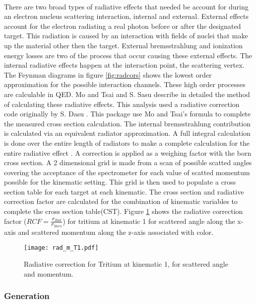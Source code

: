 \paragraph{}There are two broad types of radiative effects that needed be account for during an electron nucleus scattering interaction, internal and external. External effects account for the electron radiating a real photon before or after the designated target. This radiation is caused by an interaction with fields of nuclei that make up the material other then the target. External bremsstrahlung and ionization energy losses are two of the process that occur causing these external effects. The internal radiative effects happen at the interaction point, the scattering vertex. The Feynman diagrams in figure \ref{fig:radcors} shows the lowest order approximation for the possible interaction channels. These high order processes are calculable in QED. Mo and Tsai \cite{radcors2} and S. Sasu \cite{radcors} describe in detailed the method of calculating these radiative effects. This analysis used a radiative correction code originally by S. Dasu \cite{radcors}. This package use Mo and Tsai's formula to complete the measured cross section calculation.  The internal bremsstrahlung contribution is calculated via an equivalent radiator approximation. A full integral calculation is done over the entire length of radiators to make a complete calculation for the entire radiative effect  \cite{Ajth,radcors,radcors2,seelyth}. A correction is applied as a weighing factor with the born cross section. A 2 dimensional grid is made from a scan of possible scatted angles covering the acceptance of the spectrometer for each value of scatted momentum possible for the kinematic setting. This grid is then used to populate a cross section table for each target at each kinematic. The cross section and radiative correction factor are calculated for the combination of kinematic variables to complete the cross section table(CST). Figure \ref{RCF} shows the radiative correction factor ($RCF=\frac{\sigma_{Rad}}{\sigma_{Born}}$) for tritium at kinematic 1 for scattered angle along the x-axis and scattered momentum along the z-axis associated with color.  
\begin{figure}
	\caption{Radiative correction for Tritium at kinematic 1, for scattered angle and momentum.\label{RCF}}
	\hspace{-40pt}
	\texttt{[image: rad\_m\_T1.pdf]}
\end{figure}

\subsubsection{Generation}
